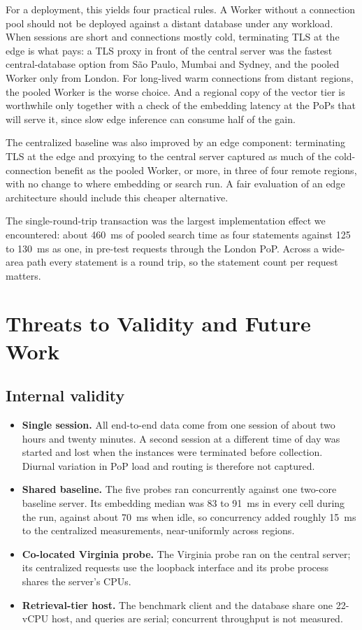 \documentclass[conference]{IEEEtran}
\begin{document}
For a deployment, this yields four practical rules. A Worker without a connection pool should not
be deployed against a distant database under any workload. When sessions are short and
connections mostly cold, terminating TLS at the edge is what pays: a TLS proxy in front of the
central server was the fastest central-database option from S\~ao Paulo, Mumbai and Sydney, and the
pooled Worker only from London. For long-lived warm connections from distant regions, the pooled
Worker is the worse choice. And a regional copy of the vector tier is
worthwhile only together with a check of the embedding latency at the PoPs that will serve it,
since slow edge inference can consume half of the gain.

The centralized baseline was also improved by an edge component: terminating TLS at the edge and
proxying to the central server captured as much of the cold-connection benefit as the pooled
Worker, or more, in three of four remote regions, with no change to where embedding or search
run. A fair evaluation of an edge architecture should include this
cheaper alternative.

The single-round-trip transaction was the largest implementation effect we encountered: about
460~ms of pooled search time as four statements against 125 to 130~ms as one, in pre-test requests
through the London PoP. Across a wide-area path every
statement is a round trip, so the statement count per request matters.

\section{Threats to Validity and Future Work}\label{sec:threats}

\subsection{Internal validity}
\begin{itemize}
\item \textbf{Single session.} All end-to-end data come from one session of about two hours and
twenty minutes. A second session at a different time of day was started and lost when the
instances were terminated before collection. Diurnal variation in PoP load and routing is
therefore not captured.
\item \textbf{Shared baseline.} The five probes ran concurrently against one two-core baseline
server. Its embedding median was 83 to 91~ms in every cell during the run, against about 70~ms
when idle, so concurrency added roughly 15~ms to the centralized measurements, near-uniformly
across regions.
\item \textbf{Co-located Virginia probe.} The Virginia probe ran on the central server; its
centralized requests use the loopback interface and its probe process shares the server's CPUs.
\item \textbf{Retrieval-tier host.} The benchmark client and the database share one 22-vCPU host,
and queries are serial; concurrent throughput is not measured.
\end{itemize}
\end{document}
